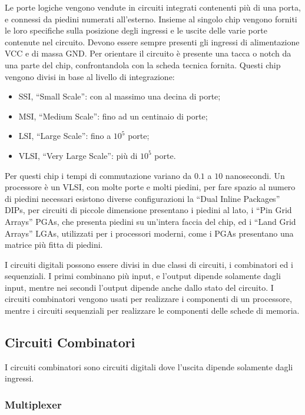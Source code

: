 \documentclass{article}
\numberwithin{equation}{subsection}
\begin{document}

Le porte logiche vengono vendute in circuiti integrati contenenti più di una porta, e connessi da piedini numerati all'esterno. Insieme al singolo chip vengono forniti le loro specifiche sulla posizione degli ingressi 
e le uscite delle varie porte contenute nel circuito. Devono essere sempre presenti gli ingressi di alimentazione VCC e di massa GND. Per orientare il circuito è presente una tacca o notch da una parte del chip, 
confrontandola con la scheda tecnica fornita. 
Questi chip vengono divisi in base al livello di integrazione:
\begin{itemize}
    \item SSI, ``Small Scale'': con al massimo una decina di porte;
    \item MSI, ``Medium Scale'': fino ad un centinaio di porte;
    \item LSI, ``Large Scale'': fino a $10^5$ porte;
    \item VLSI, ``Very Large Scale'': più di $10^5$ porte. 
\end{itemize}
Per questi chip i tempi di commutazione variano da $0.1$ a $10$ nanosecondi. 
Un processore è un VLSI, con molte porte e molti piedini, per fare spazio al numero di piedini necessari esistono diverse configurazioni la ``Dual Inline Packages'' DIPs, per circuiti di piccole dimensione 
presentano i piedini al lato, i ``Pin Grid Arrays'' PGAs, che presenta piedini su un'intera faccia del chip, ed i ``Land Grid Arrays'' LGAs, utilizzati per i processori moderni, come i PGAs presentano una matrice 
più fitta di piedini. 

I circuiti digitali possono essere divisi in due classi di circuiti, i combinatori ed i sequenziali. I primi combinano più input, e l'output dipende solamente dagli input, mentre nei secondi l'output dipende 
anche dallo stato del circuito. I circuiti combinatori vengono usati per realizzare i componenti di un processore, mentre i circuiti sequenziali per realizzare le componenti delle schede di memoria. 

\subsection{Circuiti Combinatori}

I circuiti combinatori sono circuiti digitali dove l'uscita dipende solamente dagli ingressi. 

\subsubsection{Multiplexer}
\end{document}
